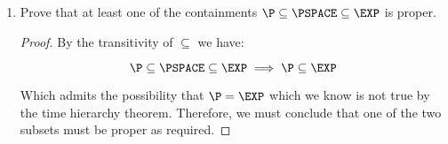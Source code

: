 \documentclass[usletter]{article}
\begin{document}
\begin{enumerate}
\begin{proof}
        Since it is possible to encode $M_{const}$ we construct $M_{\beta}$ using $M_{const}$ to take the following steps:

        \begin{enumerate}
          \item Simulate $M_{const}(\lfloor M_{const} \rfloor)$ and record the running time.
          \item If $M_{const}(\lfloor M_{const} \rfloor) = 1$ then we know that $M_{const}$ is a constant time algorithm and we simulate its execution with the input $x$.
          \item If $M_{const}(x) = 1$, write $|x|^2$ ones to a work tape and exit, otherwise exit having used a constant amount of time (by b) to run $M_{const}$ twice..
          \item Otherwise if $M_{const}(\lfloor M_{const} \rfloor) = 0$ then we know that $M_{const}$ is not a constant time algorithm, but since $M_{const}$ is a deterministic Turing machine this simulated execution has a fixed execution time $T_{const}(n)$. We simulate its execution with the input $x$ and record the running time.
          \item If $M_{const}(x) = 1$ exit having run the non-constant time $M_{const}$ twice. Otherwise write ${3 \cdot T_{const}(n)}$ ones to a work tape which is both constant and by definition must exceed the execution time of $M_{const}(\lfloor M_{const} \rfloor)$.
        \end{enumerate}

        By assumption $M_{const}(\lfloor M_{\beta} \rfloor) = 1$ if $M_{\beta}$ is a constant time algorithm and $0$ if it isn't.

        Note $M_{\beta}$ halts for all inputs.
      \end{proof}

    \item Prove that at least one of the containments $\P \subseteq \PSPACE \subseteq \EXP$ is proper.

      \begin{proof}
        By the transitivity of $\subseteq$ we have:

        \begin{equation}
          \P \subseteq \PSPACE \subseteq \EXP \implies \P \subseteq \EXP
        \end{equation}

        Which admits the possibility that $\P = \EXP$ which we know is not true by the time hierarchy theorem. Therefore, we must conclude that one of the two subsets must be proper as required.
      \end{proof}


\end{enumerate}
\end{document}
